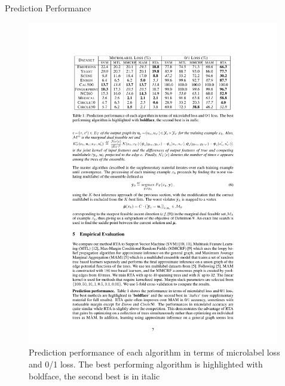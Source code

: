 \documentclass[first=dgreen,second=purple,logo=yellowexc]{aaltoslides}
\begin{document}
%
\begin{frame}{Prediction Performance}
	\begin{figure}
		\begin{center}
			\includegraphics[width=11cm]{./result_table.pdf}
			\caption{Prediction performance of each algorithm in terms of microlabel loss and 0/1 loss. The best performing algorithm is highlighted with boldface, the second best is in italic}
		\end{center}
	\end{figure}
\end{frame}

\end{document}
